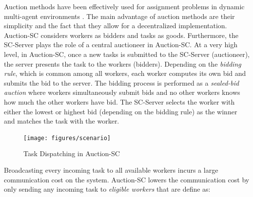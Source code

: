 

Auction methods have been effectively used for assignment problems in dynamic multi-agent environments \cite{Mehta05,Lagoudakis04}. The main advantage of auction methods are their simplicity and the fact that they allow for a decentralized implementation. Auction-SC considers workers as bidders and tasks as goods. Furthermore, the SC-Server plays the role of a central auctioneer in Auction-SC. At a very high level, in Auction-SC, once a new tasks is submitted to the SC-Server (auctioneer), the server presents the task to the workers (bidders). Depending on the \textit{bidding rule}, which is common among all workers, each worker computes its own bid and submits the bid to the server. The bidding process is performed as a \textit{sealed-bid auction} where workers simultaneously submit bids and no other workers knows how much the other workers have bid. The SC-Server selects the worker with either the lowest or highest bid (depending on the bidding rule) as the winner and matches the task with the worker.

\begin{figure}[h]
    \centering
    \texttt{[image: figures/scenario]}
    \vspace{-0.15in}
    \caption{Task Dispatching in Auction-SC}
    \label{fig:dispatch}
\end{figure}

Broadcasting every incoming task to all available workers incurs a large communication cost on the system. Auction-SC lowers the communication cost by only sending any incoming task to \textit{eligible workers} that are define as:

